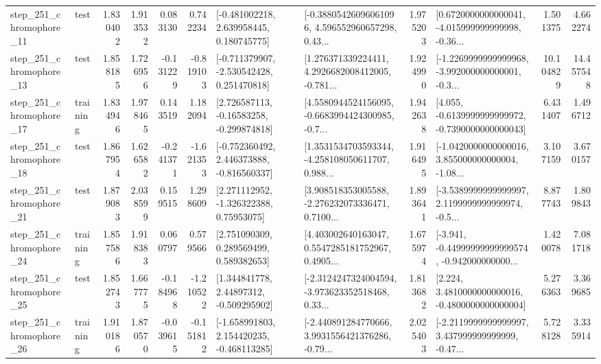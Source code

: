 \begin{tabular}{llrrrrllrlrr}
  step\_251\_chromophore\_11 &      test &      1.830402 &    1.913532 &      0.083130 &  0.742234 &    [-0.481002218, 2.639958445, 0.180745775] &  [-0.38805426096061096, 4.596552960657298, 0.43... &       1.975203 &  [0.6720000000000041, -4.015999999999998, -0.36... &            1.501375 &          4.662274 \\
  step\_251\_chromophore\_13 &      test &      1.858185 &    1.726956 &     -0.131229 & -0.819103 &   [-0.711379907, -2.530542428, 0.251470818] &  [1.276371339224411, 4.2926682008412005, -0.781... &       1.924990 &  [-1.2269999999999968, -3.992000000000001, -0.3... &           10.104829 &         14.457548 \\
  step\_251\_chromophore\_17 &  training &      1.834946 &    1.978465 &      0.143519 &  1.182094 &    [2.726587113, -0.16583258, -0.299874818] &  [4.5580944524156095, -0.6683994424300985, -0.7... &       1.942638 &  [4.055, -0.6139999999999972, -0.7390000000000043] &            6.431407 &          1.496712 \\
  step\_251\_chromophore\_18 &      test &      1.867954 &    1.626582 &     -0.241371 & -1.621353 &   [-0.752360492, 2.446373888, -0.816560337] &  [1.3531534703593344, -4.258108050611707, 0.988... &       1.916495 &  [-1.0420000000000016, 3.855000000000004, -1.08... &            3.107159 &          3.670157 \\
  step\_251\_chromophore\_21 &      test &      1.879083 &    2.038599 &      0.159515 &  1.298609 &     [2.271112952, -1.326322388, 0.75953075] &  [3.908518353005588, -2.276232073336471, 0.7100... &       1.893641 &  [-3.5389999999999997, 2.1199999999999974, -0.5... &            8.877743 &          1.809843 \\
  step\_251\_chromophore\_24 &  training &      1.857586 &    1.918383 &      0.060797 &  0.579566 &     [2.751090309, 0.289569499, 0.589382653] &  [4.403002640163047, 0.5547285181752967, 0.4905... &       1.675974 &  [-3.941, -0.44999999999999574, -0.942000000000... &            1.420078 &          7.081718 \\
  step\_251\_chromophore\_25 &      test &      1.852743 &    1.667775 &     -0.184968 & -1.210522 &     [1.344841778, 2.44897312, -0.509295902] &  [-2.3124247324004594, -3.973623352518468, 0.33... &       1.813682 &   [2.224, 3.4810000000000016, -0.4800000000000004] &            5.276363 &          3.369685 \\
  step\_251\_chromophore\_26 &  training &      1.910186 &    1.870570 &     -0.039615 & -0.151812 &   [-1.658991803, 2.154420235, -0.468113285] &  [-2.440891284770666, 3.9931556421376286, -0.79... &       2.025403 &  [-2.2119999999999997, 3.437999999999999, -0.47... &            5.728128 &          3.335914 \\

\end{tabular}
